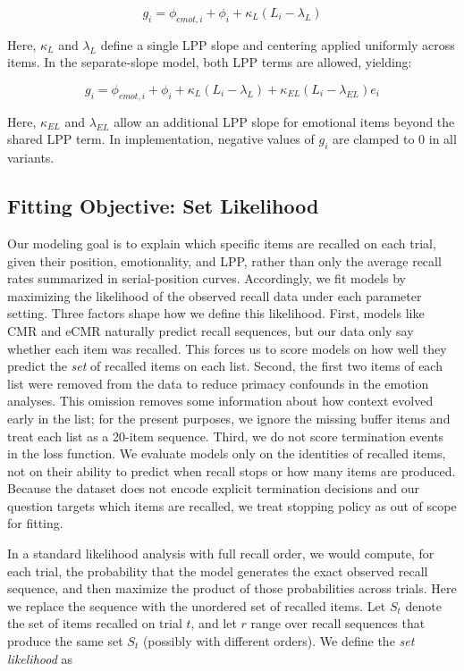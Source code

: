 \documentclass[
  man,
  longtable,
  nolmodern,
  notxfonts,
  notimes,
  draftfirst,
  colorlinks=true,linkcolor=blue,citecolor=blue,urlcolor=blue]{apa7}
\begin{document}
\[
g_i = \phi_{emot,i} + \phi_i + \kappa_L (L_i - \lambda_L)
\]

Here, \(\kappa_L\) and \(\lambda_L\) define a single LPP slope and
centering applied uniformly across items. In the separate-slope model,
both LPP terms are allowed, yielding:

\[
g_i = \phi_{emot,i} + \phi_i + \kappa_L (L_i - \lambda_L) + \kappa_{EL} (L_i - \lambda_{EL}) e_i
\]

Here, \(\kappa_{EL}\) and \(\lambda_{EL}\) allow an additional LPP slope
for emotional items beyond the shared LPP term. In implementation,
negative values of \(g_i\) are clamped to 0 in all variants.

\subsection{Fitting Objective: Set
Likelihood}\label{fitting-objective-set-likelihood}

Our modeling goal is to explain which specific items are recalled on
each trial, given their position, emotionality, and LPP, rather than
only the average recall rates summarized in serial-position curves.
Accordingly, we fit models by maximizing the likelihood of the observed
recall data under each parameter setting. Three factors shape how we
define this likelihood. First, models like CMR and eCMR naturally
predict recall sequences, but our data only say whether each item was
recalled. This forces us to score models on how well they predict the
\emph{set} of recalled items on each list. Second, the first two items
of each list were removed from the data to reduce primacy confounds in
the emotion analyses. This omission removes some information about how
context evolved early in the list; for the present purposes, we ignore
the missing buffer items and treat each list as a 20-item sequence.
Third, we do not score termination events in the loss function. We
evaluate models only on the identities of recalled items, not on their
ability to predict when recall stops or how many items are produced.
Because the dataset does not encode explicit termination decisions and
our question targets which items are recalled, we treat stopping policy
as out of scope for fitting.

In a standard likelihood analysis with full recall order, we would
compute, for each trial, the probability that the model generates the
exact observed recall sequence, and then maximize the product of those
probabilities across trials. Here we replace the sequence with the
unordered set of recalled items. Let \(S_t\) denote the set of items
recalled on trial \(t\), and let \(r\) range over recall sequences that
produce the same set \(S_t\) (possibly with different orders). We define
the \emph{set likelihood} as
\end{document}

